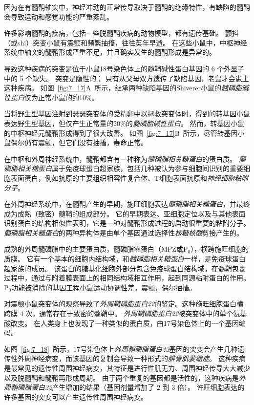 \begin{proposition}[髓鞘蛋白缺陷破坏神经信号传导] \label{box:7_3}
	
	\quad \quad 因为在有髓鞘轴突中，神经冲动的正常传导取决于髓鞘的绝缘特性，有缺陷的髓鞘会导致运动和感觉功能的严重紊乱。
	
	\quad \quad 许多影响髓鞘的疾病，包括一些脱髓鞘疾病的动物模型，都有遗传基础。
	颤抖（或shi）突变小鼠有震颤和频繁抽搐，往往英年早逝。
	在这些小鼠中，中枢神经系统中轴突的髓鞘形成严重不足，并且确实发生的髓鞘形成是异常的。
	
	\quad \quad 导致这种疾病的突变是位于小鼠18号染色体上的髓鞘碱性蛋白基因的 6 个外显子中的 5 个缺失。
	突变是隐性的；
	只有从父母双方遗传了缺陷基因，老鼠才会患上这种疾病。
	如图~\ref{fig:7_17}A~所示，继承两种缺陷基因的Shiverer小鼠的\textit{髓磷脂碱性蛋白}仅为正常小鼠的约10\%。
	
	\quad \quad 当将野生型基因注射到瑟瑟突变体的受精卵中以拯救突变体时，得到的转基因小鼠表达野生型基因，但仅产生正常量的20\%的\textit{髓磷脂碱性蛋白}。
	然而，转基因小鼠的中枢神经元髓鞘形成得到了很大改善。
	如图~\ref{fig:7_17}B~所示，尽管转基因小鼠偶尔仍有震颤，但它们没有抽搐，寿命正常。
	
	\quad \quad 在中枢和外周神经系统中，髓鞘都含有一种称为\textit{髓磷脂相关糖蛋白}的蛋白质。
	\textit{髓磷脂相关糖蛋白}属于免疫球蛋白超家族，包括几种被认为参与细胞间识别的重要细胞表面蛋白，例如抗原的主要组织相容性复合体、T细胞表面抗原和\textit{神经细胞粘附分子}。
	
	\quad \quad 在外周神经系统中，在髓鞘产生的早期，施旺细胞表达\textit{髓磷脂相关糖蛋白}，并最终成为成熟（致密）髓鞘的组成部分。
	它的早期表达、亚细胞定位以及与其他表面识别蛋白的结构相似性表明，它是一种对髓鞘形成过程的启动很重要的粘附分子。
	\textit{髓磷脂相关糖蛋白}的两种异构体是由单个基因通过选择性\textit{核糖核酸}剪接产生的。
	
	\quad 成熟的外周髓磷脂中的主要蛋白质，髓磷脂零蛋白（MPZ或P$_0$），横跨施旺细胞的质膜。
	它有一个基本的细胞内结构域，和\textit{髓磷脂相关糖蛋白}一样，是免疫球蛋白超家族的成员。
	该蛋白的糖基化细胞外部分包含免疫球蛋白结构域，在髓鞘包裹过程中，通过与附着膜表面上的相同结构域相互作用，起到同源粘附蛋白的作用。
	P$_0$功能被消除的基因工程小鼠运动协调性差，震颤，偶尔抽搐。
	
	\quad 对震颤小鼠突变体的观察导致了\textit{外周鞘磷脂蛋白22}的鉴定。这种施旺细胞蛋白横跨膜 4 次，通常存在于致密的髓鞘中。
	\textit{外周鞘磷脂蛋白22}被突变体中的单个氨基酸改变。
	在人类身上也发现了一种类似的蛋白质，由17号染色体上的一个基因编码。
	
	\quad \quad 如图~\ref{fig:7_18}~所示，17号染色体上\textit{外周鞘磷脂蛋白22}基因的突变会产生几种遗传性外周神经病变，而该基因的复制会导致一种形式的\textit{腓骨肌萎缩症}。
	这种疾病是最常见的遗传性周围神经病变，其特征是进行性肌无力、周围神经传导大大减少以及脱髓鞘和髓鞘再形成周期。
	由于两个重复的基因都是活性的，这种疾病是\textit{外周鞘磷脂蛋白22}产生增加的结果（基因剂量增加了 2 到 3 倍）。
	许旺细胞表达的许多基因的突变可以产生遗传性周围神经病变。
	

\end{proposition}
